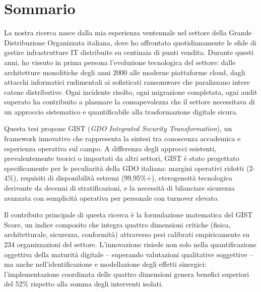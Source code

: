 \documentclass[12pt,a4paper,oneside]{book}
\begin{document}
\frontmatter


\clearpage

\pagestyle{plain} %

\clearpage

\tableofcontents
\clearpage

\listoffigures
\clearpage

\listoftables
\clearpage

\printglossaries
\clearpage

\mainmatter


\section*{Sommario}
La nostra ricerca nasce dalla mia esperienza ventennale nel settore della Grande Distribuzione Organizzata italiana, dove ho affrontato quotidianamente le sfide di gestire infrastrutture IT distribuite su centinaia di punti vendita. Durante questi anni, ho vissuto in prima persona l'evoluzione tecnologica del settore: dalle architetture monolitiche degli anni 2000 alle moderne piattaforme cloud, dagli attacchi informatici rudimentali ai sofisticati ransomware che paralizzano intere catene distributive. Ogni incidente risolto, ogni migrazione completata, ogni audit superato ha contribuito a plasmare la consapevolezza che il settore necessitava di un approccio sistematico e quantificabile alla trasformazione digitale sicura.

Questa tesi propone GIST (\textit{GDO Integrated Security Transformation}), un framework innovativo che rappresenta la sintesi tra conoscenza accademica e esperienza operativa sul campo. A differenza degli approcci esistenti, prevalentemente teorici o importati da altri settori, GIST è stato progettato specificamente per le peculiarità della GDO italiana: margini operativi ridotti (2-4\%), requisiti di disponibilità estremi (99,95\%+), eterogeneità tecnologica derivante da decenni di stratificazioni, e la necessità di bilanciare sicurezza avanzata con semplicità operativa per personale con turnover elevato.

Il contributo principale di questa ricerca è la formulazione matematica del GIST Score, un indice composito che integra quattro dimensioni critiche (fisica, architetturale, sicurezza, conformità) attraverso pesi calibrati empiricamente su 234 organizzazioni del settore. L'innovazione risiede non solo nella quantificazione oggettiva della maturità digitale -- superando valutazioni qualitative soggettive -- ma anche nell'identificazione e modellazione degli effetti sinergici: l'implementazione coordinata delle quattro dimensioni genera benefici superiori del 52\% rispetto alla somma degli interventi isolati.
\end{document}
